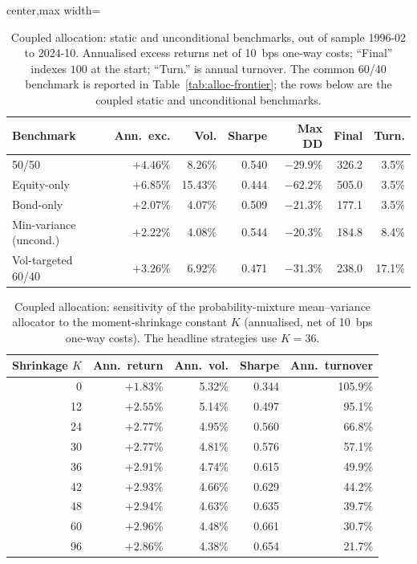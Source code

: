 \begin{table}[H]
\centering
\caption{Coupled allocation: static and unconditional benchmarks, out of sample 1996-02 to
2024-10. Annualised excess returns net of 10~bps one-way costs; ``Final'' indexes $100$ at
the start; ``Turn.'' is annual turnover. The common 60/40 benchmark is reported in Table~\ref{tab:alloc-frontier}; the rows below are the coupled static and unconditional benchmarks.}
\label{tab:c-benchmarks}
\small
\begin{adjustbox}{center,max width=\linewidth}
\begin{tabular}{lrrrrrr}
\toprule
Benchmark & Ann.\ exc. & Vol. & Sharpe & Max DD & Final & Turn. \\
\midrule
50/50 & $+4.46\%$ & 8.26\% & 0.540 & $-29.9\%$ & 326.2 & \phantom{0}3.5\% \\
Equity-only & $+6.85\%$ & 15.43\% & 0.444 & $-62.2\%$ & 505.0 & \phantom{0}3.5\% \\
Bond-only & $+2.07\%$ & 4.07\% & 0.509 & $-21.3\%$ & 177.1 & \phantom{0}3.5\% \\
Min-variance (uncond.) & $+2.22\%$ & 4.08\% & 0.544 & $-20.3\%$ & 184.8 & \phantom{0}8.4\% \\
Vol-targeted 60/40 & $+3.26\%$ & 6.92\% & 0.471 & $-31.3\%$ & 238.0 & 17.1\% \\
\bottomrule
\end{tabular}
\end{adjustbox}
\end{table}

\begin{table}[H]
\centering
\caption{Coupled allocation: sensitivity of the probability-mixture mean--variance allocator
to the moment-shrinkage constant $K$ (annualised, net of 10~bps one-way costs). The headline
strategies use $K=36$.}
\label{tab:c-shrinkage}
\small
\begin{tabular}{rrrrr}
\toprule
Shrinkage $K$ & Ann.\ return & Ann.\ vol. & Sharpe & Ann.\ turnover \\
\midrule
0  & $+1.83\%$ & 5.32\% & 0.344 & 105.9\% \\
12 & $+2.55\%$ & 5.14\% & 0.497 & 95.1\% \\
24 & $+2.77\%$ & 4.95\% & 0.560 & 66.8\% \\
30 & $+2.77\%$ & 4.81\% & 0.576 & 57.1\% \\
36 & $+2.91\%$ & 4.74\% & 0.615 & 49.9\% \\
42 & $+2.93\%$ & 4.66\% & 0.629 & 44.2\% \\
48 & $+2.94\%$ & 4.63\% & 0.635 & 39.7\% \\
60 & $+2.96\%$ & 4.48\% & 0.661 & 30.7\% \\
96 & $+2.86\%$ & 4.38\% & 0.654 & 21.7\% \\
\bottomrule
\end{tabular}
\end{table}

